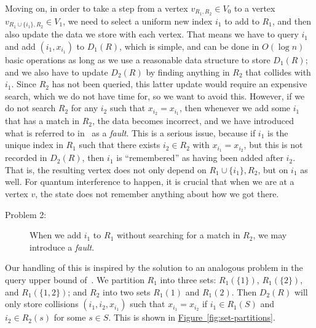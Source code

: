 \documentclass{article}
\newcommand{\fig}[1]{\hyperref[fig:#1]{Figure~\ref*{fig:#1}}}
\renewcommand{\>}{\rangle}
\newcommand{\<}{\langle}
\renewcommand{\(}{\left(}
\renewcommand{\)}{\right)}
\begin{document}
Moving on, in order to take a step from a vertex $v_{R_1,R_2}\in V_0$ to a vertex $v_{R_1\cup\{i_1\},R_2}\in V_1$, we need to select a uniform new index $i_1$ to add to $R_1$, and then also update the data we store with each vertex. That means we have to query $i_1$ and add $(i_1,x_{i_1})$ to $D_1(R)$, which is simple, and can be done in $O(\log n)$ basic operations as long as we use a reasonable data structure to store $D_1(R)$; and we also have to update $D_2(R)$ by finding anything in $R_2$ that collides with $i_1$. Since $R_2$ has not been queried, this latter update would require an expensive search, which we do not have time for, so we want to avoid this. However, if we do not search $R_2$ for any $i_2$ such that $x_{i_2}=x_{i_1}$, then whenever we add some $i_1$ that has a match in $R_2$, the data becomes incorrect, and we have introduced what is referred to in~\cite{belovs2012kDist} as a \emph{fault}. This is a serious issue, because if $i_1$ is the unique index in $R_1$ such that there exists $i_2\in R_2$ with $x_{i_1}=x_{i_2}$, but this is not recorded in $D_2(R)$, then $i_1$ is ``remembered'' as having been added after $i_2$. That is, the resulting vertex does not only depend on $R_1\cup\{i_1\},R_2$, but on $i_1$ as well. For quantum interference to happen, it is crucial that when we are at a vertex $v$, the state does not remember anything about how we got there. 
\begin{description}
\item[Problem 2:] When we add $i_1$ to $R_1$ without searching for a match in $R_2$, we may introduce a \emph{fault}. 
\end{description}Our handling of this is inspired by the solution to an analogous problem in the query upper bound of~\cite{belovs2012kDist}. We partition $R_1$ into three sets: $R_1(\{1\})$, $R_1(\{2\})$, and $R_1(\{1,2\})$; and $R_2$ into two sets $R_1(1)$ and $R_1(2)$. Then $D_2(R)$ will only store collisions $(i_1,i_2,x_{i_1})$ such that $x_{i_1}=x_{i_2}$ if $i_1\in R_1(S)$ and $i_2\in R_2(s)$ for some $s\in S$. This is shown in \fig{set-partitions}.
\end{document}
